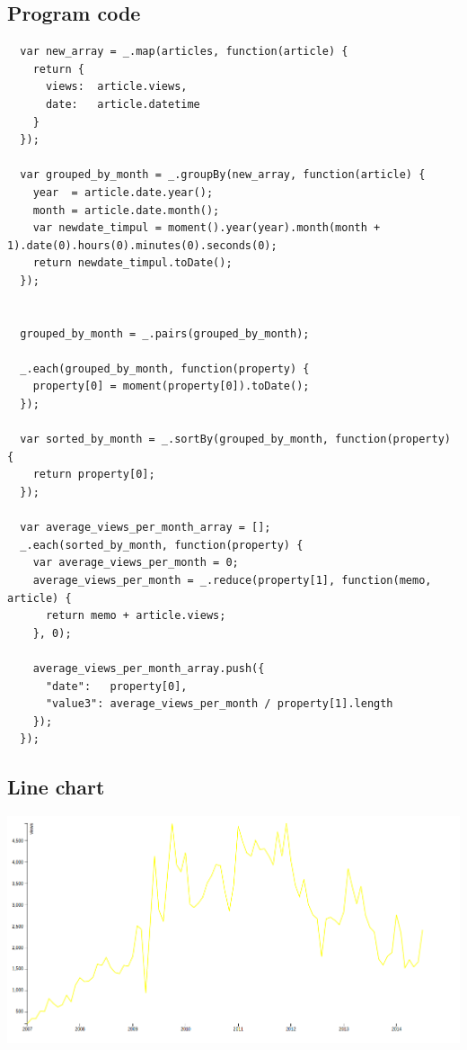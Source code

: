 \documentclass[12pt,a4paper]{article}
\begin{document}
\subsection*{Program code}
\begin{lstlisting}
  var new_array = _.map(articles, function(article) {
    return {
      views:  article.views,
      date:   article.datetime
    }
  });

  var grouped_by_month = _.groupBy(new_array, function(article) {
    year  = article.date.year();
    month = article.date.month();
    var newdate_timpul = moment().year(year).month(month + 1).date(0).hours(0).minutes(0).seconds(0);
    return newdate_timpul.toDate();
  });


  grouped_by_month = _.pairs(grouped_by_month);

  _.each(grouped_by_month, function(property) {
    property[0] = moment(property[0]).toDate();
  });

  var sorted_by_month = _.sortBy(grouped_by_month, function(property) {
    return property[0];
  });

  var average_views_per_month_array = [];
  _.each(sorted_by_month, function(property) {
    var average_views_per_month = 0;
    average_views_per_month = _.reduce(property[1], function(memo, article) {
      return memo + article.views;
    }, 0);

    average_views_per_month_array.push({
      "date":   property[0],
      "value3": average_views_per_month / property[1].length
    });
  });
\end{lstlisting}

\subsection*{Line chart}
\begin{center}
 \includegraphics[width=6in]{Lab3d3.png}
\end{center}
\end{document}
